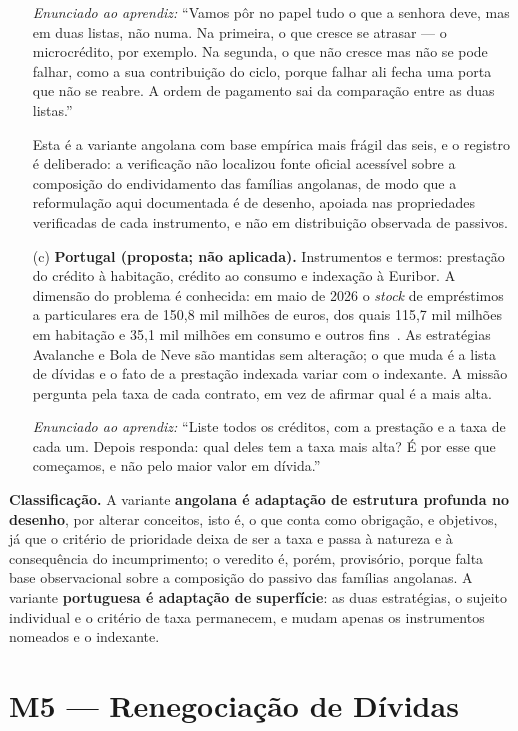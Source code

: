 \begin{enumerate}
\noindent\textit{Enunciado ao aprendiz:} ``Vamos pôr no papel tudo o que a senhora deve, mas em duas listas, não numa. Na primeira, o que cresce se atrasar --- o microcrédito, por exemplo. Na segunda, o que não cresce mas não se pode falhar, como a sua contribuição do ciclo, porque falhar ali fecha uma porta que não se reabre. A ordem de pagamento sai da comparação entre as duas listas.''

Esta é a variante angolana com base empírica mais frágil das seis, e o registro é deliberado: a verificação não localizou fonte oficial acessível sobre a composição do endividamento das famílias angolanas, de modo que a reformulação aqui documentada é de desenho, apoiada nas propriedades verificadas de cada instrumento, e não em distribuição observada de passivos.

\item[(c)] \textbf{Portugal (proposta; não aplicada).} Instrumentos e termos: prestação do crédito à habitação, crédito ao consumo e indexação à Euribor. A dimensão do problema é conhecida: em maio de 2026 o \textit{stock} de empréstimos a particulares era de 150,8 mil milhões de euros, dos quais 115,7 mil milhões em habitação e 35,1 mil milhões em consumo e outros fins~\cite{leitao2025}. As estratégias Avalanche e Bola de Neve são mantidas sem alteração; o que muda é a lista de dívidas e o fato de a prestação indexada variar com o indexante. A missão pergunta pela taxa de cada contrato, em vez de afirmar qual é a mais alta.

\noindent\textit{Enunciado ao aprendiz:} ``Liste todos os créditos, com a prestação e a taxa de cada um. Depois responda: qual deles tem a taxa mais alta? É por esse que começamos, e não pelo maior valor em dívida.''
\end{enumerate}

\noindent\textbf{Classificação.} A variante \textbf{angolana é adaptação de estrutura profunda no desenho}, por alterar conceitos, isto é, o que conta como obrigação, e objetivos, já que o critério de prioridade deixa de ser a taxa e passa à natureza e à consequência do incumprimento; o veredito é, porém, provisório, porque falta base observacional sobre a composição do passivo das famílias angolanas. A variante \textbf{portuguesa é adaptação de superfície}: as duas estratégias, o sujeito individual e o critério de taxa permanecem, e mudam apenas os instrumentos nomeados e o indexante.

\section*{M5 --- Renegociação de Dívidas}

